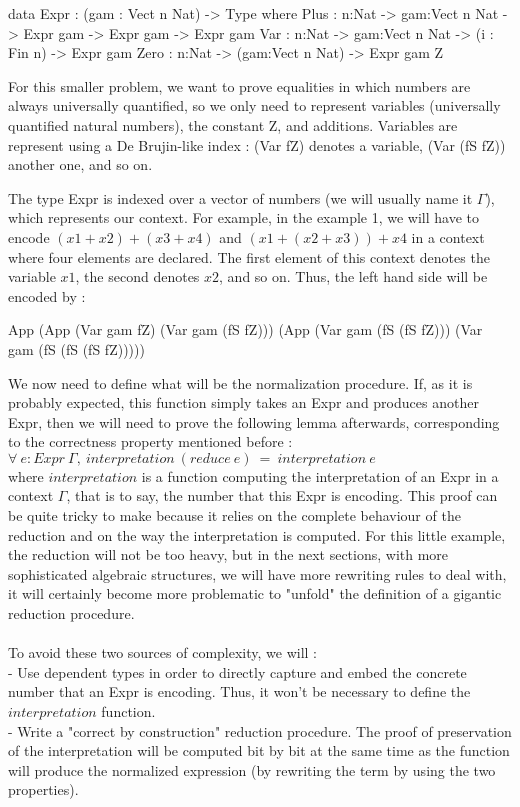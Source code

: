 \documentclass{sigplanconf}
\begin{document}
\begin{code}[caption=First version of reflected numbers, captionpos=b, label=lst1:haskell2]
data Expr : (gam : Vect n Nat) -> Type where
     Plus : {n:Nat} -> {gam:Vect n Nat} -> 
            Expr gam -> Expr gam -> Expr gam
     Var  : {n:Nat} -> {gam:Vect n Nat} -> 
            (i : Fin n) -> Expr gam
     Zero : {n:Nat} -> (gam:Vect n Nat) -> 
            Expr gam Z
\end{code}

For this smaller problem, we want to prove equalities in which numbers are always universally quantified, so we only need to represent variables (universally quantified natural numbers), the constant Z, and additions.
Variables are represent using a De Brujin-like index : (Var fZ) denotes a variable, (Var (fS fZ)) another one, and so on.

The type Expr is indexed over a vector of numbers (we will usually name it $\Gamma$), which represents our context. For example, in the example 1, we will have to encode $(x1 + x2) + (x3 + x4)$ and $(x1 + (x2 + x3)) + x4$ in a context where four elements are declared. The first element of this context denotes the variable $x1$, the second denotes $x2$, and so on.
Thus, the left hand side will be encoded by :
\begin{code}[caption=Reflected LHS of example 1, captionpos=b, label=lst1:haskell2]
App (App (Var gam fZ) 
         (Var gam (fS fZ))) 
    (App (Var gam (fS (fS fZ))) 
         (Var gam (fS (fS (fS fZ)))))
\end{code}

We now need to define what will be the normalization procedure.
If, as it is probably expected, this function simply takes an Expr and produces another Expr, then we will need to prove the following lemma afterwards, corresponding to the correctness property mentioned before : \\
$\forall\ e:Expr\ \Gamma,\ interpretation\ (reduce\ e)\ =\ interpretation\ e$ \\
where $interpretation$ is a function computing the interpretation of an Expr in a context $\Gamma$, that is to say, the number that this Expr is encoding.
This proof can be quite tricky to make because it relies on the complete behaviour of the reduction and on the way the interpretation is computed.
For this little example, the reduction will not be too heavy, but in the next sections, with more sophisticated algebraic structures, we will have more rewriting rules to deal with, it will certainly become more problematic to "unfold" the definition of a gigantic reduction procedure. \\
\\
To avoid these two sources of complexity, we will : \\
- Use dependent types in order to directly capture and embed the concrete number that an Expr is encoding. Thus, it won't be necessary to define the $interpretation$ function. \\
- Write a "correct by construction" reduction procedure. The proof of preservation of the interpretation will be computed bit by bit at the same time as the function will produce the normalized expression (by rewriting the term by using the two properties).
\end{document}
